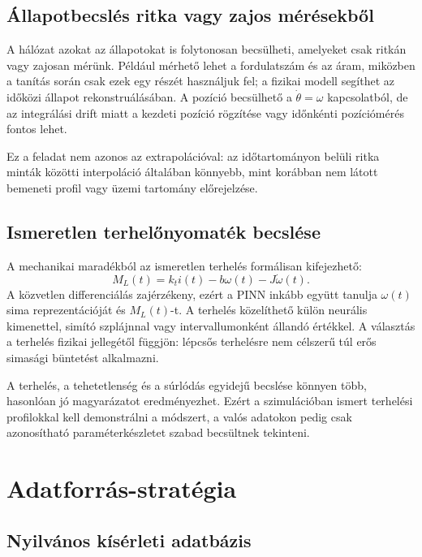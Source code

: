 \documentclass[11pt,a4paper]{article}
\begin{document}
\subsection{Állapotbecslés ritka vagy zajos mérésekből}

A hálózat azokat az állapotokat is folytonosan becsülheti, amelyeket csak ritkán vagy zajosan mérünk. Például mérhető lehet a fordulatszám és az áram, miközben a tanítás során csak ezek egy részét használjuk fel; a fizikai modell segíthet az időközi állapot rekonstruálásában. A pozíció becsülhető a $\dot{\theta}=\omega$ kapcsolatból, de az integrálási drift miatt a kezdeti pozíció rögzítése vagy időnkénti pozíciómérés fontos lehet.

Ez a feladat nem azonos az extrapolációval: az időtartományon belüli ritka minták közötti interpoláció általában könnyebb, mint korábban nem látott bemeneti profil vagy üzemi tartomány előrejelzése.

\subsection{Ismeretlen terhelőnyomaték becslése}

A mechanikai maradékból az ismeretlen terhelés formálisan kifejezhető:
\begin{equation}
  M_L(t)=k_t i(t)-b\omega(t)-J\dot{\omega}(t).
  \label{eq:loadformal}
\end{equation}
A közvetlen differenciálás zajérzékeny, ezért a PINN inkább együtt tanulja $\omega(t)$ sima reprezentációját és $M_L(t)$-t. A terhelés közelíthető külön neurális kimenettel, simító szplájnnal vagy intervallumonként állandó értékkel. A választás a terhelés fizikai jellegétől függjön: lépcsős terhelésre nem célszerű túl erős simasági büntetést alkalmazni.

A terhelés, a tehetetlenség és a súrlódás egyidejű becslése könnyen több, hasonlóan jó magyarázatot eredményezhet. Ezért a szimulációban ismert terhelési profilokkal kell demonstrálni a módszert, a valós adatokon pedig csak azonosítható paraméterkészletet szabad becsültnek tekinteni.

\section{Adatforrás-stratégia}

\subsection{Nyilvános kísérleti adatbázis}
\end{document}
